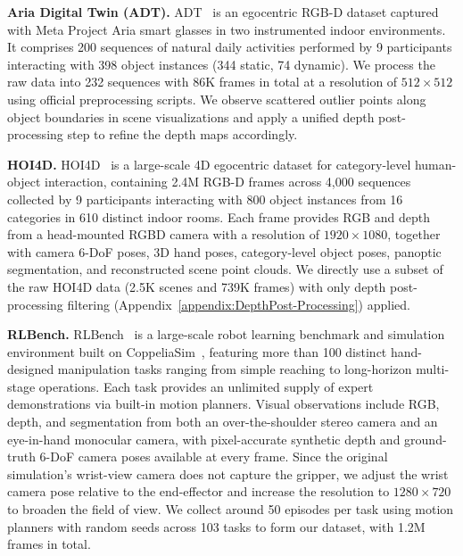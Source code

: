 \documentclass{llmxive}
\begin{document}
\textbf{Aria Digital Twin (ADT).}
ADT~\citep{pan2023aria} is an egocentric RGB-D dataset captured with Meta Project Aria smart glasses in two instrumented indoor environments.
%
It comprises 200 sequences of natural daily activities performed by 9 participants interacting with 398 object instances (344 static, 74 dynamic). 
%
We process the raw data into 232 sequences with 86K frames in total at a resolution of $512 \times 512$ using official preprocessing scripts. 
%
We observe scattered outlier points along object boundaries in scene visualizations and apply a unified depth post-processing step to refine the depth maps accordingly.


\textbf{HOI4D.}
HOI4D~\citep{liu2022hoi4d} is a large-scale 4D egocentric dataset for category-level human-object interaction, containing 2.4M RGB-D frames across 4,000 sequences collected by 9 participants interacting with 800 object instances from 16 categories in 610 distinct indoor rooms.
%
Each frame provides RGB and depth from a head-mounted RGBD camera with a resolution of $1920 \times 1080$, together with camera 6-DoF poses, 3D hand poses, category-level object poses, panoptic segmentation, and reconstructed scene point clouds.
%
We directly use a subset of the raw HOI4D data (2.5K scenes and 739K frames) with only depth post-processing filtering (Appendix~\ref{appendix:DepthPost-Processing}) applied.



\textbf{RLBench.}
RLBench~\citep{james2020rlbench} is a large-scale robot learning benchmark and simulation environment built on CoppeliaSim~\citep{rohmer2013CoppeliaSim}, featuring more than 100 distinct hand-designed manipulation tasks ranging from simple reaching to long-horizon multi-stage operations.
%
Each task provides an unlimited supply of expert demonstrations via built-in motion planners. 
%
Visual observations include RGB, depth, and segmentation from both an over-the-shoulder stereo camera and an eye-in-hand monocular camera, with pixel-accurate synthetic depth and ground-truth 6-DoF camera poses available at every frame.
%
Since the original simulation's wrist-view camera does not capture the gripper, we adjust the wrist camera pose relative to the end-effector and increase the resolution to $1280 \times 720$ to broaden the field of view.
%
We collect around 50 episodes per task using motion planners with random seeds across 103 tasks to form our dataset, with 1.2M frames in total.
\end{document}
